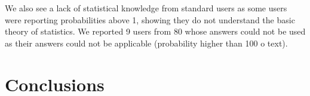 \documentclass[a4paper,3p,sort&compress]{elsarticle}
\begin{document}
We also see a lack of statistical knowledge from standard users as some users were reporting probabilities above 1, showing they do not understand the basic theory of statistics. We reported 9 users from 80 whose answers could not be used as their answers could not be applicable (probability higher than 100 o text).

\section{Conclusions}
\label{sec:concl}


\end{document}
